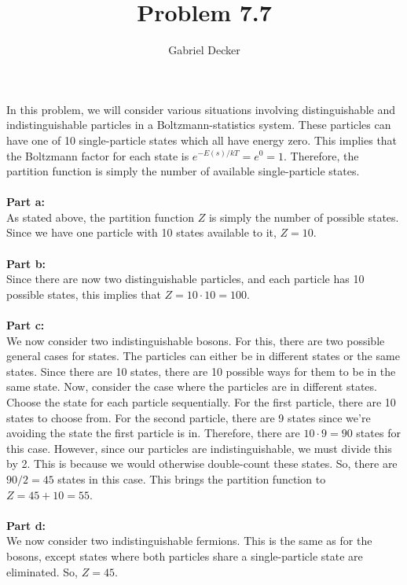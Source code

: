 \documentclass[12pt]{article}
\title{Problem 7.7}
\author{Gabriel Decker}
\begin{document}
\maketitle
\begin{flushleft}



In this problem, we will consider various situations involving distinguishable and indistinguishable particles in a Boltzmann-statistics system.
These particles can have one of 10 single-particle states which all have energy zero.
This implies that the Boltzmann factor for each state is $e^{-E(s)/kT}=e^0=1$.
Therefore, the partition function is simply the number of available single-particle states.\\~\\

\textbf{Part a:}\\
As stated above, the partition function $Z$ is simply the number of possible states.
Since we have one particle with 10 states available to it, $Z=10$.\\~\\

\textbf{Part b:}\\
Since there are now two distinguishable particles, and each particle has 10 possible states, this implies that $Z=10\cdot10=100$.\\~\\

\textbf{Part c:}\\
We now consider two indistinguishable bosons.
For this, there are two possible general cases for states.
The particles can either be in different states or the same states.
Since there are 10 states, there are 10 possible ways for them to be in the same state.
Now, consider the case where the particles are in different states.
Choose the state for each particle sequentially.
For the first particle, there are 10 states to choose from.
For the second particle, there are 9 states since we're avoiding the state the first particle is in.
Therefore, there are $10\cdot9=90$ states for this case.
However, since our particles are indistinguishable, we must divide this by 2.
This is because we would otherwise double-count these states.
So, there are $90/2=45$ states in this case.
This brings the partition function to $Z=45+10=55$.\\~\\

\textbf{Part d:}\\
We now consider two indistinguishable fermions.
This is the same as for the bosons, except states where both particles share a single-particle state are eliminated.
So, $Z=45$.\\~\\


\end{flushleft}
\end{document}
